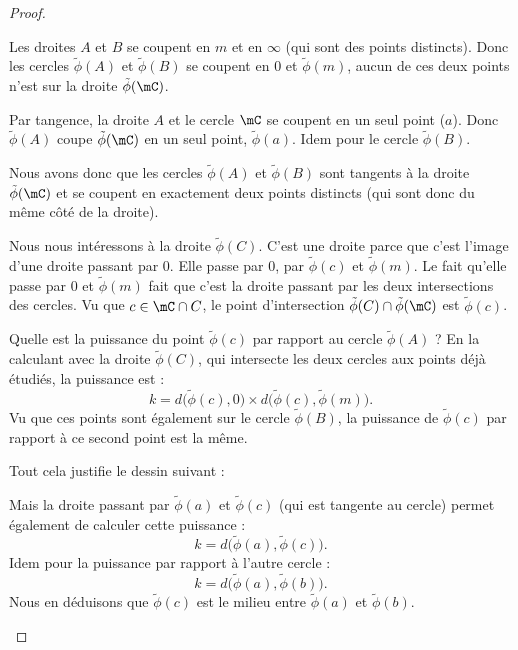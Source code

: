 \begin{proof}
\begin{subproof}
            Les droites \( A\) et \( B\) se coupent en \( m\) et en \( \infty\) (qui sont des points distincts). Donc les cercles \( \tilde \phi(A)\) et \( \tilde \phi(B)\) se coupent en \( 0\) et \( \tilde \phi(m)\), aucun de ces deux points n'est sur la droite \( \tilde \phi(\mC)\).

            Par tangence, la droite \( A\) et le cercle \( \mC\) se coupent en un seul point (\( a\)). Donc \( \tilde \phi(A)\) coupe \( \tilde \phi(\mC)\) en un seul point, \( \tilde \phi(a)\). Idem pour le cercle \( \tilde \phi(B)\).

            Nous avons donc que les cercles \( \tilde \phi(A)\) et \( \tilde \phi(B)\) sont tangents à la droite \( \tilde \phi(\mC)\) et se coupent en exactement deux points distincts (qui sont donc du même côté de la droite).

            Nous nous intéressons à la droite \( \tilde \phi(C)\). C'est une droite parce que c'est l'image d'une droite passant par \( 0\). Elle passe par \( 0\), par \( \tilde \phi(c)\) et \( \tilde \phi(m)\). Le fait qu'elle passe par \( 0\) et \( \tilde \phi(m)\) fait que c'est la droite passant par les deux intersections des cercles. Vu que \( c\in \mC\cap C\), le point d'intersection \( \tilde \phi(C)\cap \tilde \phi(\mC)\) est \( \tilde \phi(c)\).

            Quelle est la puissance du point \( \tilde \phi(c)\) par rapport au cercle \( \tilde \phi(A)\) ? En la calculant avec la droite \( \tilde \phi(C)\), qui intersecte les deux cercles aux points déjà étudiés, la puissance est :
            \begin{equation}
                k=d\big( \tilde \phi(c),0 \big)\times d\big( \tilde \phi(c),\tilde \phi(m) \big).
            \end{equation}
            Vu que ces points sont également sur le cercle \( \tilde \phi(B)\), la puissance de \( \tilde \phi(c)\) par rapport à ce second point est la même.

            Tout cela justifie le dessin suivant :

            Mais la droite passant par \( \tilde \phi(a)\) et \( \tilde \phi(c)\) (qui est tangente au cercle) permet également de calculer cette puissance :
            \begin{equation}
                k=d\big( \tilde \phi(a),\tilde \phi(c) \big).
            \end{equation}
            Idem pour la puissance par rapport à l'autre cercle :
            \begin{equation}
                k=d\big( \tilde \phi(a),\tilde \phi(b) \big).
            \end{equation}
            Nous en déduisons que \( \tilde \phi(c)\) est le milieu entre \( \tilde \phi(a)\) et \( \tilde \phi(b)\).


\end{subproof}
\end{proof}
